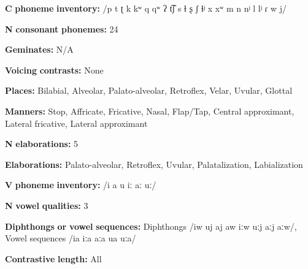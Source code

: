 \documentclass[output=paper]{langsci/langscibook}
\begin{document}
\begin{styleBody}
\textbf{C} \textbf{phoneme} \textbf{inventory:} /p t ʈ k kʷ q qʷ ʔ t͡ʃ s ɬ ʂ ʃ ɬʲ x xʷ m n nʲ l lʲ ɾ w j/
\end{styleBody}

\begin{styleBody}
\textbf{N} \textbf{consonant} \textbf{phonemes:} 24
\end{styleBody}

\begin{styleBody}
\textbf{Geminates:} N/A
\end{styleBody}

\begin{styleBody}
\textbf{Voicing} \textbf{contrasts:} None
\end{styleBody}

\begin{styleBody}
\textbf{Places:} Bilabial, Alveolar, Palato-alveolar, Retroflex, Velar, Uvular, Glottal
\end{styleBody}

\begin{styleBody}
\textbf{Manners:} Stop, Affricate, Fricative, Nasal, Flap/Tap, Central approximant, Lateral fricative, Lateral approximant
\end{styleBody}

\begin{styleBody}
\textbf{N} \textbf{elaborations:} 5
\end{styleBody}

\begin{styleBody}
\textbf{Elaborations:} Palato-alveolar, Retroflex, Uvular, Palatalization, Labialization
\end{styleBody}

\begin{styleBody}
\textbf{V} \textbf{phoneme} \textbf{inventory:} /i a u iː aː uː/
\end{styleBody}

\begin{styleBody}
\textbf{N} \textbf{vowel} \textbf{qualities:} 3
\end{styleBody}

\begin{styleBody}
\textbf{Diphthongs} \textbf{or} \textbf{vowel} \textbf{sequences:} Diphthongs /iw uj aj aw iːw uːj aːj aːw/, Vowel sequences /ia iːa aːa ua uːa/
\end{styleBody}

\begin{styleBody}
\textbf{Contrastive} \textbf{length:} All
\end{styleBody}
\end{document}

